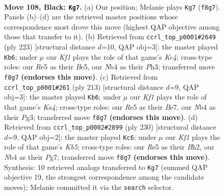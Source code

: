 \documentclass[11pt]{article}
\begin{document}
\clearpage

\begin{figure}[p]\centering
\begin{subfigure}{0.46\textwidth}\centering
\resizebox{\linewidth}{!}{%
\newchessgame
\chessboard[
  setfen={5k2/8/6B1/4r1p1/1n6/6K1/8/8 b - - 1 108},
  showmover=false,
  pgfstyle=straightmove, color=movearrow, markmove={f8-g7}
]}
\caption{}
\end{subfigure}\hfill
\begin{subfigure}{0.46\textwidth}\centering
\resizebox{\linewidth}{!}{%
\newchessgame
\chessboard[
  setfen={B7/8/8/2k1b3/8/6pp/8/5K2 b - - 65 112},
  showmover=false,
  pgfstyle=straightmove, color=movearrow, markmove={c5-b6}
]}
\caption{}
\end{subfigure}
\\[4pt]
\begin{subfigure}{0.46\textwidth}\centering
\resizebox{\linewidth}{!}{%
\newchessgame
\chessboard[
  setfen={8/4b3/2B5/k1p5/8/1K4p1/8/8 b - - 85 107},
  showmover=false,
  pgfstyle=straightmove, color=movearrow, markmove={a5-b6}
]}
\caption{}
\end{subfigure}\hfill
\begin{subfigure}{0.46\textwidth}\centering
\resizebox{\linewidth}{!}{%
\newchessgame
\chessboard[
  setfen={3k4/6P1/3P4/1K6/8/1b6/7B/8 w - - 15 116},
  showmover=false,
  pgfstyle=straightmove, color=movearrow, markmove={b5-c6}
]}
\caption{}
\end{subfigure}
\caption{\textbf{Move 108, Black: \texttt{Kg7}.} (a) Our position; Melanie plays \texttt{Kg7} (\texttt{f8g7}). Panels (b)--(d) are the retrieved master positions whose correspondence most drove this move (highest QAP objective among those that transfer to it). (b) Retrieved from \texttt{ccrl\_top\_p0001\#2649} (ply 223) [structural distance $d$=10, QAP obj=3]: the master played \texttt{Kb6}; under $\mu$ our \emph{Kf1} plays the role of that game's \emph{Kc4}; cross-type roles: our \emph{R}e5 as their \emph{B}e5, our \emph{N}b4 as their \emph{P}h3; transferred move \texttt{f8g7} \textbf{(endorses this move)}. (c) Retrieved from \texttt{ccrl\_top\_p0001\#261} (ply 213) [structural distance $d$=9, QAP obj=3]: the master played \texttt{Kb6}; under $\mu$ our \emph{Kf1} plays the role of that game's \emph{Ka4}; cross-type roles: our \emph{R}e5 as their \emph{B}e7, our \emph{N}b4 as their \emph{P}g3; transferred move \texttt{f8g7} \textbf{(endorses this move)}. (d) Retrieved from \texttt{ccrl\_top\_p0002\#2899} (ply 230) [structural distance $d$=9, QAP obj=2]: the master played \texttt{Kc6}; under $\mu$ our \emph{Kf1} plays the role of that game's \emph{Kb5}; cross-type roles: our \emph{R}e5 as their \emph{B}h2, our \emph{N}b4 as their \emph{P}g7; transferred move \texttt{f8g7} \textbf{(endorses this move)}. Synthesis: 10 retrieved analogs transferred to \texttt{Kg7} (summed QAP objective 19, the strongest correspondence among the candidate moves); Melanie committed it via the \texttt{search} selector.}
\label{fig:thought-m215}
\end{figure}
\end{document}
